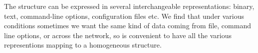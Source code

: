 The structure
can be expressed in several interchangeable representations:
binary, text, command-line options, configuration
files etc.  
%
We find that under various conditions sometimes we want the same kind
of data coming from file, command line options, or across the network,
so is convenient to have all the various representions mapping to a
homogeneous structure.


















